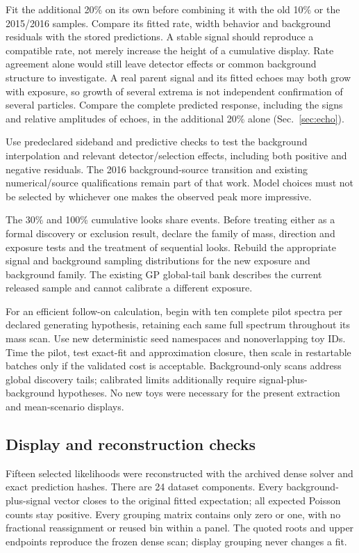 Fit the additional 20\% on its own before combining it with the old 10\% or the 2015/2016 samples. Compare its fitted rate, width behavior and background residuals with the stored predictions. A stable signal should reproduce a compatible rate, not merely increase the height of a cumulative display. Rate agreement alone would still leave detector effects or common background structure to investigate. A real parent signal and its fitted echoes may both grow with exposure, so growth of several extrema is not independent confirmation of several particles. Compare the complete predicted response, including the signs and relative amplitudes of echoes, in the additional 20\% alone (Sec.~\ref{sec:echo}).

Use predeclared sideband and predictive checks to test the background interpolation and relevant detector/selection effects, including both positive and negative residuals. The 2016 background-source transition and existing numerical/source qualifications remain part of that work. Model choices must not be selected by whichever one makes the observed peak more impressive.

The 30\% and 100\% cumulative looks share events. Before treating either as a formal discovery or exclusion result, declare the family of mass, direction and exposure tests and the treatment of sequential looks. Rebuild the appropriate signal and background sampling distributions for the new exposure and background family. The existing GP global-tail bank describes the current released sample and cannot calibrate a different exposure.

For an efficient follow-on calculation, begin with ten complete pilot spectra per declared generating hypothesis, retaining each same full spectrum throughout its mass scan. Use new deterministic seed namespaces and nonoverlapping toy IDs. Time the pilot, test exact-fit and approximation closure, then scale in restartable batches only if the validated cost is acceptable. Background-only scans address global discovery tails; calibrated limits additionally require signal-plus-background hypotheses. No new toys were necessary for the present extraction and mean-scenario displays.

\clearpage
\subsection*{Display and reconstruction checks}
Fifteen selected likelihoods were reconstructed with the archived dense solver and exact prediction hashes. There are 24 dataset components. Every background-plus-signal vector closes to the original fitted expectation; all expected Poisson counts stay positive. Every grouping matrix contains only zero or one, with no fractional reassignment or reused bin within a panel. The quoted roots and upper endpoints reproduce the frozen dense scan; display grouping never changes a fit.


